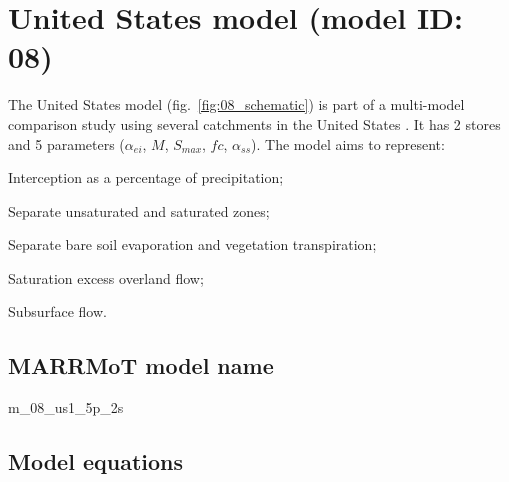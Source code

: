 \section{United States model (model ID: 08)}
The United States model (fig.~\ref{fig:08_schematic}) is part of a multi-model comparison study using several catchments in the United States \citep{Bai2009}. It has 2 stores and 5 parameters ($\alpha_{ei}$, $M$, $S_{max}$, $fc$, $\alpha_{ss}$). The model aims to represent:

\begin{itemizecompact}
\item Interception as a percentage of precipitation;
\item Separate unsaturated and saturated zones;
\item Separate bare soil evaporation and vegetation transpiration;
\item Saturation excess overland flow;
\item Subsurface flow.
\end{itemizecompact}

\subsection{MARRMoT model name}
m\_08\_us1\_5p\_2s \\

\subsection{Model equations}

